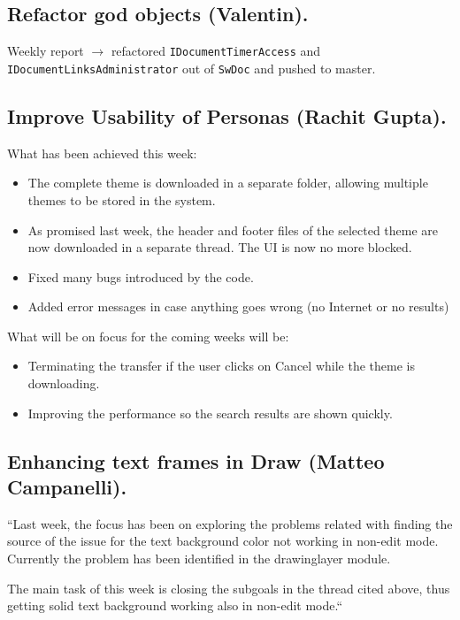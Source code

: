 \documentclass{article}
\begin{document}
\subsection{Refactor god objects (Valentin).}

Weekly report $\rightarrow$ refactored \lstinline|IDocumentTimerAccess| and \lstinline|IDocumentLinksAdministrator| out of \lstinline|SwDoc| and pushed to master.

\subsection{Improve Usability of Personas (Rachit Gupta).}

What has been achieved this week\cite{gsocPersona}:
\begin{itemize}
    \item The complete theme is downloaded in a separate folder, allowing multiple themes to be stored in the system.
    \item As promised last week, the header and footer files of the selected theme are now downloaded in a separate thread. The UI is now no more blocked.
    \item Fixed many bugs introduced by the code.
    \item Added error messages in case anything goes wrong (no Internet or no results)

\end{itemize}

What will be on focus for the coming weeks will be:
\begin{itemize}
    \item Terminating the transfer if the user clicks on Cancel while the theme is downloading.
    \item Improving the performance so the search results are shown quickly.
\end{itemize}

\subsection{Enhancing text frames in Draw (Matteo Campanelli).}

``Last week, the focus has been on exploring the problems related with finding the source of the issue for the text background color not working in non-edit mode.
Currently the problem has been identified in the drawinglayer module\cite{gsocTextFrameDrawMl}.

The main task of this week is closing the subgoals in the thread cited above, thus getting solid text background working also in non-edit mode.``\cite{gsocTextFrameDraw}
\end{document}
